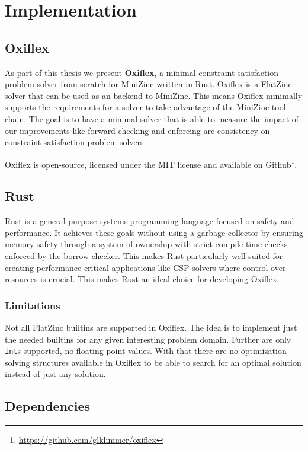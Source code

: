\chapter{Implementation} \label{chap:impl}

\section{Oxiflex}

As part of this thesis we present \textbf{Oxiflex}, a minimal constraint satisfaction problem solver from scratch for MiniZinc written in Rust. Oxiflex is a FlatZinc solver that can be used as an backend to MiniZinc. This means Oxiflex minimally supports the requirements for a solver to take advantage of the MiniZinc tool chain. The goal is to have a minimal solver that is able to measure the impact of our improvements like forward checking and enforcing arc consistency on constraint satisfaction problem solvers.

Oxiflex is open-source, licensed under the MIT license and available on Github\footnote{\url{https://github.com/glklimmer/oxiflex}}.

\section{Rust}

Rust \cite{rust:2014} is a general purpose systems programming language focused on safety and performance. It achieves these goals without using a garbage collector by ensuring memory safety through a system of ownership with strict compile-time checks enforced by the borrow checker. This makes Rust particularly well-suited for creating performance-critical applications like CSP solvers where control over resources is crucial. This makes Rust an ideal choice for developing Oxiflex.

\subsection{Limitations}

Not all FlatZinc builtins are supported in Oxiflex. The idea is to implement just the needed builtins for any given interesting problem domain. Further are only \verb|int|s supported, no floating point values. With that there are no optimization solving structures available in Oxiflex to be able to search for an optimal solution instead of just any solution.

\section{Dependencies}

